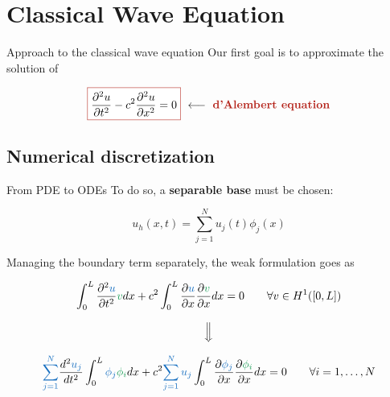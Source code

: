 \section{Classical Wave Equation}

\begin{frame}{Approach to the classical wave equation}
    Our first goal is to approximate the solution of

    \begin{equation*}
        \fcolorbox{BrickRed}{white}{$\displaystyle\frac{\partial^2u}{\partial t^2}-c^2\frac{\partial^2u}{\partial x^2}=0$} \ \longleftarrow \ \text{\textbf{\textcolor{BrickRed}{d'Alembert equation}}}
    \end{equation*}

    \vfill

    \pause

    
\end{frame}

\subsection{Numerical discretization}

\begin{frame}{From PDE to ODEs}
    To do so, a \textbf{separable base} must be chosen:

    \begin{equation*}
        u_h(x,t)=\sum_{j=1}^Nu_j(t)\phi_j(x)
    \end{equation*}

    \vfill

    \pause

    Managing the boundary term separately, the weak formulation goes as

    \small

    \begin{equation*}
        \int_0^L\frac{\partial^2\textcolor{RoyalBlue}{u}}{\partial t^2}\textcolor{ForestGreen}{v}dx+c^2\int_0^L\frac{\partial\textcolor{RoyalBlue}{u}}{\partial x}\frac{\partial\textcolor{ForestGreen}{v}}{\partial x}dx=0 \qquad \forall v\in H^1([0,L])
    \end{equation*}

    \pause

    \begin{equation*}
        \Big\Downarrow
    \end{equation*}

    \vspace{-0.35cm}

    \begin{equation*}
        \textcolor{RoyalBlue}{\sum_{j=1}^N}\frac{d^2\textcolor{RoyalBlue}{u_j}}{dt^2}\int_0^L\textcolor{RoyalBlue}{\phi_j}\textcolor{ForestGreen}{\phi_i}dx+c^2\textcolor{RoyalBlue}{\sum_{j=1}^Nu_j}\int_0^L\frac{\partial\textcolor{RoyalBlue}{\phi_j}}{\partial x}\frac{\partial\textcolor{ForestGreen}{\phi_i}}{\partial x}dx=0 \qquad \forall i=1,\dots,N
    \end{equation*}

    \normalsize
\end{frame}

